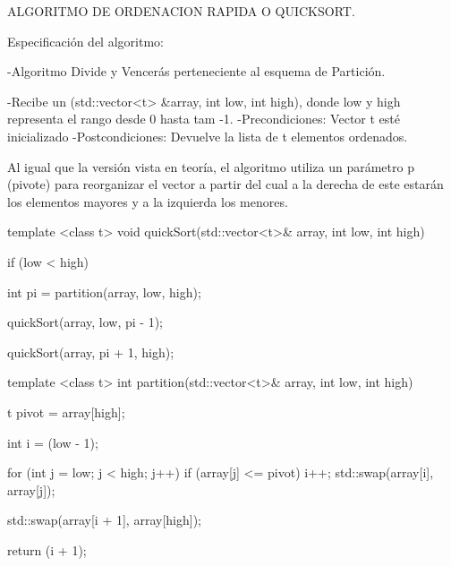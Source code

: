 ALGORITMO DE ORDENACION RAPIDA O QUICKSORT.


Especificación del algoritmo:

-Algoritmo Divide y Vencerás perteneciente al esquema de Partición.

-Recibe un (std::vector<t> &array, int low, int high), donde low y high representa el rango desde 0 hasta tam -1.  
-Precondiciones: Vector t esté inicializado
-Postcondiciones: Devuelve la lista de t elementos ordenados.

Al igual que la versión vista en teoría, el algoritmo utiliza un parámetro p (pivote) para reorganizar el
vector a partir del cual a la derecha de este estarán los elementos mayores y a la izquierda los menores.

template <class t>
void quickSort(std::vector<t>& array, int low, int high) {
  if (low < high) {
      
    int pi = partition(array, low, high);

    quickSort(array, low, pi - 1);

    quickSort(array, pi + 1, high);
  }
}

template <class t>
int partition(std::vector<t>& array, int low, int high) {
    
  t pivot = array[high];
  
  int i = (low - 1);

  for (int j = low; j < high; j++) {
    if (array[j] <= pivot) {
      i++;  
      std::swap(array[i], array[j]);
    }
  }
  
  std::swap(array[i + 1], array[high]);
  
  return (i + 1);
}
